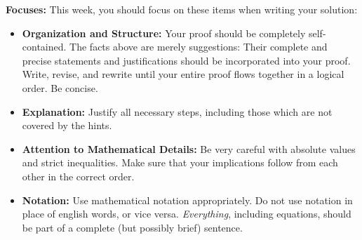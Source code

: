\documentclass{ximera}
\begin{document}
\begin{problem}
\begin{itemize}
\end{itemize}

\textbf{Focuses:} This week, you should focus on these items when writing your solution:
\begin{itemize}
	\item \textbf{Organization and Structure:} Your proof should be completely self-contained. The facts above are merely suggestions: Their complete and precise statements and justifications should be incorporated into your proof. Write, revise, and rewrite until your entire proof flows together in a logical order. Be concise.
	\item \textbf{Explanation:} Justify all necessary steps, including those which are not covered by the hints.
	\item \textbf{Attention to Mathematical Details:} Be very careful with absolute values and strict inequalities. Make sure that your implications follow from each other in the correct order.
	\item \textbf{Notation:} Use mathematical notation appropriately. Do not use notation in place of english words, or vice versa. \emph{Everything}, including equations, should be part of a complete (but possibly brief) sentence.
\end{itemize}

\end{problem}
\end{document}
